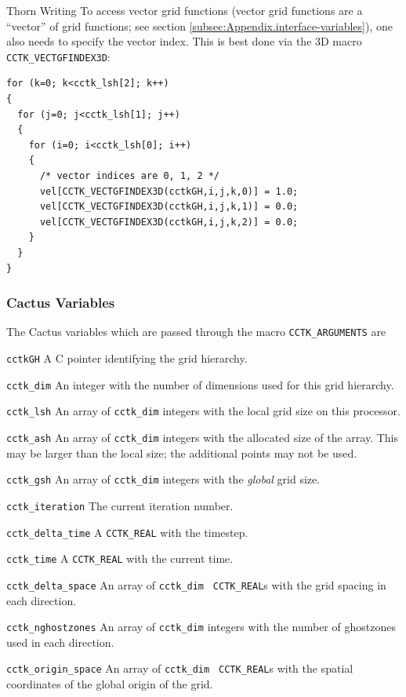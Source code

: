 \begin{cactuspart}{Thorn Writing}
To access vector grid functions (vector grid functions are a
``vector'' of grid functions; see section
\ref{subsec:Appendix.interface-variables}), one also needs to specify
the vector index. This is best done via the 3D macro
\texttt{CCTK\_VECTGFINDEX3D}:
\begin{verbatim}
for (k=0; k<cctk_lsh[2]; k++)
{
  for (j=0; j<cctk_lsh[1]; j++)
  {
    for (i=0; i<cctk_lsh[0]; i++)
    {
      /* vector indices are 0, 1, 2 */
      vel[CCTK_VECTGFINDEX3D(cctkGH,i,j,k,0)] = 1.0;
      vel[CCTK_VECTGFINDEX3D(cctkGH,i,j,k,1)] = 0.0;
      vel[CCTK_VECTGFINDEX3D(cctkGH,i,j,k,2)] = 0.0;
    }
  }
}
\end{verbatim}

\subsubsection{Cactus Variables}
\label{sec:cactus_variables_c}

The Cactus variables which are passed through the macro
\texttt{CCTK\_ARGUMENTS} are
\begin{Lentry}
\item [\texttt{cctkGH}] A C pointer identifying the grid hierarchy.
\item [\texttt{cctk\_dim}] An integer with the number of dimensions
      used for this grid hierarchy.
\item [\texttt{cctk\_lsh}] An array of \texttt{cctk\_dim} integers
      with the local grid size on this processor.
\item [\texttt{cctk\_ash}] An array of \texttt{cctk\_dim} integers
      with the allocated size of the array.  This may be larger than
      the local size; the additional points may not be used.
\item [\texttt{cctk\_gsh}] An array of \texttt{cctk\_dim} integers
      with the \textit{global} grid size.
\item [\texttt{cctk\_iteration}] The current iteration number.
\item [\texttt{cctk\_delta\_time}] A \texttt{CCTK\_REAL} with the timestep.
\item [\texttt{cctk\_time}] A \texttt{CCTK\_REAL} with the current time.
\item [\texttt{cctk\_delta\_space}] An array of \texttt{cctk\_dim} {\tt
CCTK\_REAL}s with the grid spacing in each direction.
\item [\texttt{cctk\_nghostzones}] An array of \texttt{cctk\_dim} integers with
         the number of ghostzones used in each direction.
\item [\texttt{cctk\_origin\_space}] An array of \texttt{cctk\_dim} {\tt
      CCTK\_REAL}s with the spatial coordinates of the global origin
      of the grid.


\end{Lentry}
\end{cactuspart}
